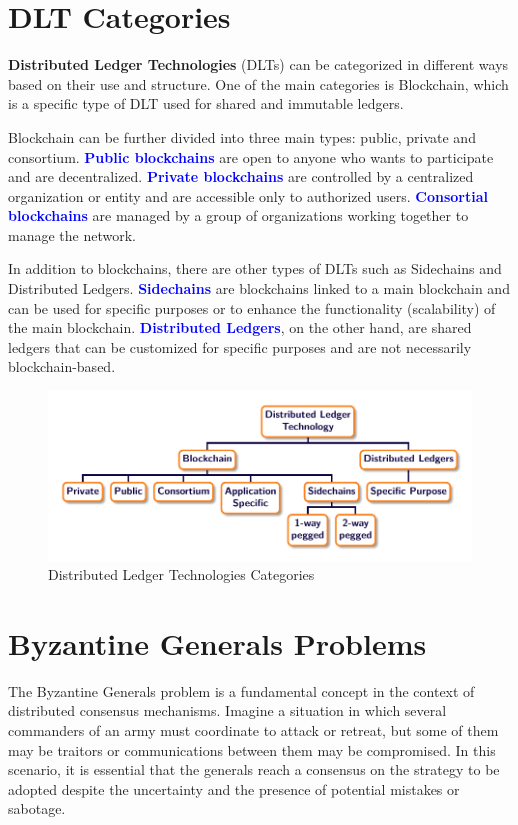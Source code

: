 \section{DLT Categories}
\textbf{Distributed Ledger Technologies} (DLTs) can be categorized in different ways based on their use and structure. One of the main categories is Blockchain, which is a specific type of DLT used for shared and immutable ledgers.

Blockchain can be further divided into three main types: public, private and consortium. \textbf{\textcolor{Blue}{Public blockchains}} are open to anyone who wants to participate and are decentralized. \textbf{\textcolor{Blue}{Private blockchains}} are controlled by a centralized organization or entity and are accessible only to authorized users. \textbf{\textcolor{Blue}{Consortial blockchains}} are managed by a group of organizations working together to manage the network.

In addition to blockchains, there are other types of DLTs such as Sidechains and Distributed Ledgers. \textbf{\textcolor{Blue}{Sidechains}} are blockchains linked to a main blockchain and can be used for specific purposes or to enhance the functionality (scalability) of the main blockchain. \textbf{\textcolor{Blue}{Distributed Ledgers}}, on the other hand, are shared ledgers that can be customized for specific purposes and are not necessarily blockchain-based.

\begin{figure}[h]
\centering\includegraphics[scale=1]{tikz/chapter3 - DLT.pdf}
\caption{Distributed Ledger Technologies Categories}
\end{figure}

\section{Byzantine Generals Problems}
The Byzantine Generals problem is a fundamental concept in the context of distributed consensus mechanisms. Imagine a situation in which several commanders of an army must coordinate to attack or retreat, but some of them may be traitors or communications between them may be compromised. In this scenario, it is essential that the generals reach a consensus on the strategy to be adopted despite the uncertainty and the presence of potential mistakes or sabotage.

